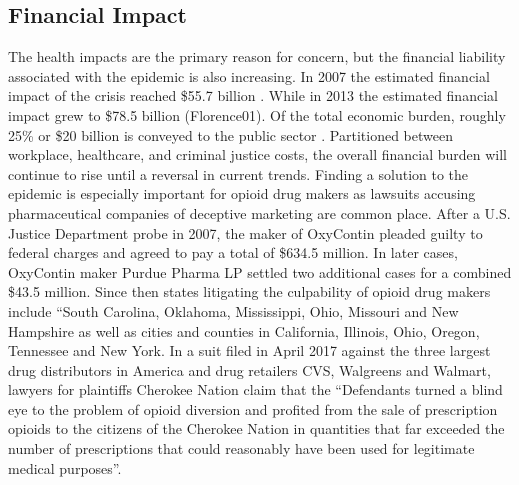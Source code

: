 \documentclass[sigconf]{acmart}
\begin{document}
\subsection{Financial Impact} 
The health impacts are the primary reason for concern, but the financial liability associated with the epidemic is also increasing. In 2007 the estimated financial impact of the crisis reached \$55.7 billion \cite{Birnbaum01}. While in 2013 the estimated financial impact grew to \$78.5 billion (Florence01). Of the total economic burden, roughly 25\% or \$20 billion is conveyed to the public sector \cite{Florence01}. Partitioned between workplace, healthcare, and criminal justice costs, the overall financial burden will continue to rise until a reversal in current trends. Finding a solution to the epidemic is especially important for opioid drug makers as lawsuits accusing pharmaceutical companies of deceptive marketing are common place. After a U.S. Justice Department probe in 2007, the maker of OxyContin pleaded guilty to federal charges and agreed to pay a total of \$634.5 million. In later cases, OxyContin maker Purdue Pharma LP settled two additional cases for a combined \$43.5 million. Since then states litigating the culpability of opioid drug makers include “South Carolina, Oklahoma, Mississippi, Ohio, Missouri and New Hampshire as well as cities and counties in California, Illinois, Ohio, Oregon, Tennessee and New York\cite{opsis11}. In a suit filed in April 2017 against the three largest drug distributors in America and drug retailers CVS, Walgreens and Walmart, lawyers for plaintiffs Cherokee Nation claim that the “Defendants turned a blind eye to the problem of opioid diversion and profited from the sale of prescription opioids to the citizens of the Cherokee Nation in quantities that far exceeded the number of prescriptions that could reasonably have been used for legitimate medical purposes”\cite{opsis5}.
\end{document}
